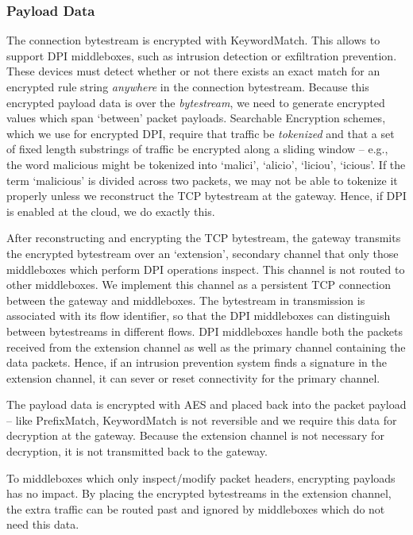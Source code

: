 \subsubsection{Payload Data} 
The connection bytestream is encrypted with KeywordMatch.
This allows \sys to support DPI middleboxes, such as intrusion detection or exfiltration prevention.
These devices must detect whether or not there exists an exact match for an encrypted rule string {\it anywhere} in the connection bytestream.
Because this encrypted payload data is over the {\it bytestream}, we need to generate encrypted values which span `between' packet payloads. 
Searchable Encryption schemes, which we use for encrypted DPI, require that traffic be {\it tokenized} and that a set of fixed length substrings of traffic be encrypted along a sliding window -- e.g., the word malicious might be tokenized into {`malici', `alicio', `liciou', `icious'}.
If the term `malicious' is divided across two packets, we may not be able to tokenize it properly unless we reconstruct the TCP bytestream at the gateway. Hence, if DPI is enabled at the cloud, we do exactly this.

After reconstructing and encrypting the TCP bytestream, the gateway transmits the encrypted bytestream over 
an `extension', secondary channel that only those middleboxes which perform DPI operations inspect. 
This channel is not routed to other middleboxes. We implement this channel as a persistent TCP connection 
between the gateway and middleboxes. The bytestream in transmission is associated with its flow identifier, 
so that the DPI middleboxes can distinguish between bytestreams in different flows.
DPI middleboxes handle both the packets received from the extension channel as well as the primary channel containing the data packets. 
Hence, if an intrusion prevention system finds a signature in the extension channel, it can sever or reset connectivity for the primary channel.

 The payload data is encrypted with AES and placed back into the packet payload -- like PrefixMatch, KeywordMatch is not reversible and we require this data for decryption at the gateway.
Because the extension channel is not necessary for decryption, it is not transmitted back to the gateway.

 To middleboxes which only inspect/modify packet headers, encrypting payloads has no impact. 
By placing the encrypted bytestreams in the extension channel, the extra traffic can be routed past and ignored by middleboxes which do not need this data. %

